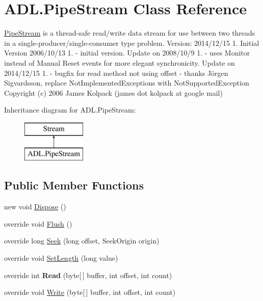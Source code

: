 \hypertarget{class_a_d_l_1_1_pipe_stream}{}\section{A\+D\+L.\+Pipe\+Stream Class Reference}
\label{class_a_d_l_1_1_pipe_stream}


\mbox{\hyperlink{class_a_d_l_1_1_pipe_stream}{Pipe\+Stream}} is a thread-\/safe read/write data stream for use between two threads in a single-\/producer/single-\/consumer type problem. Version\+: 2014/12/15 1. Initial Version 2006/10/13 1. -\/ initial version. Update on 2008/10/9 1. -\/ uses Monitor instead of Manual Reset events for more elegant synchronicity. Update on 2014/12/15 1. -\/ bugfix for read method not using offset -\/ thanks Jörgen Sigvardsson, replace Not\+Implemented\+Exceptions with Not\+Supported\+Exception Copyright (c) 2006 James Kolpack (james dot kolpack at google mail)  


Inheritance diagram for A\+D\+L.\+Pipe\+Stream\+:\begin{figure}[H]
\begin{center}
\leavevmode
\includegraphics[height=2.000000cm]{class_a_d_l_1_1_pipe_stream}
\end{center}
\end{figure}
\subsection*{Public Member Functions}
\begin{DoxyCompactItemize}
\item 
new void \mbox{\hyperlink{class_a_d_l_1_1_pipe_stream_a430dca29f0cd1ff4a27fc7bcafbe7a8f}{Dispose}} ()
\item 
override void \mbox{\hyperlink{class_a_d_l_1_1_pipe_stream_aef56d04b8d784d6606ed348971eb29f3}{Flush}} ()
\item 
override long \mbox{\hyperlink{class_a_d_l_1_1_pipe_stream_ae34adb2842a65053e2e13dcb15fe65e5}{Seek}} (long offset, Seek\+Origin origin)
\item 
override void \mbox{\hyperlink{class_a_d_l_1_1_pipe_stream_a66a10533676de87061ae89c0ab2c62c5}{Set\+Length}} (long value)
\item 
\mbox{\label{class_a_d_l_1_1_pipe_stream_ada829c0b71d6896e2bb3cd5d37ccba34}} 
override int {\bfseries Read} (byte\mbox{[}$\,$\mbox{]} buffer, int offset, int count)
\item 
override void \mbox{\hyperlink{class_a_d_l_1_1_pipe_stream_a5f8e6e0a0b7070fc2e5320d2007eadd1}{Write}} (byte\mbox{[}$\,$\mbox{]} buffer, int offset, int count)
\end{DoxyCompactItemize}
